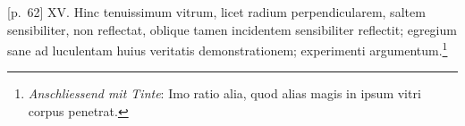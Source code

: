 \pend \pstart {} [p.~62] XV. Hinc tenuissimum vitrum, licet radium\protect{} perpendicularem, saltem sensibiliter, non reflectat, oblique tamen incidentem sensibiliter reflectit; egregium sane ad luculentam huius veritatis demonstrationem; experimenti argumentum.\footnote{\textit{Anschliessend mit Tinte}: Imo ratio alia, quod alias magis in ipsum vitri corpus penetrat.}